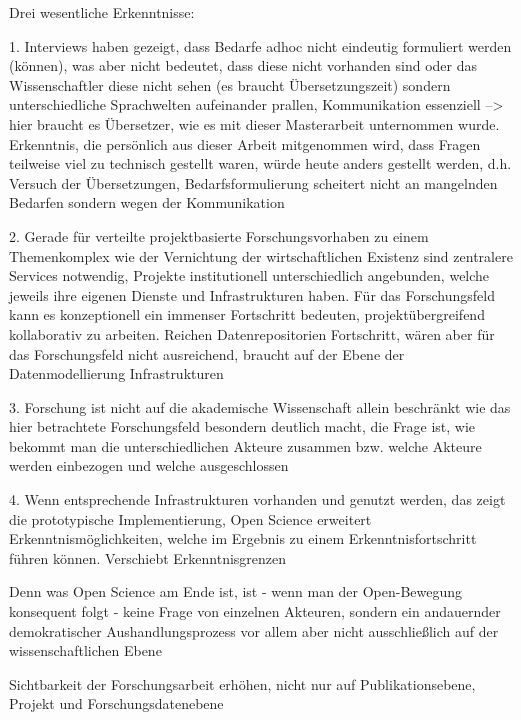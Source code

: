 \onehalfspacing



Drei wesentliche Erkenntnisse:

1. Interviews haben gezeigt, dass Bedarfe adhoc nicht eindeutig formuliert werden (können), was aber nicht bedeutet, dass diese nicht vorhanden sind oder das Wissenschaftler diese nicht sehen (es braucht Übersetzungszeit) sondern unterschiedliche Sprachwelten aufeinander prallen, Kommunikation essenziell --> hier braucht es Übersetzer, wie es mit dieser Masterarbeit unternommen wurde. Erkenntnis, die persönlich aus dieser Arbeit mitgenommen wird, dass Fragen teilweise viel zu technisch gestellt waren, würde heute anders gestellt werden, d.h. Versuch der Übersetzungen, Bedarfsformulierung scheitert nicht an mangelnden Bedarfen sondern wegen der Kommunikation

2. Gerade für verteilte projektbasierte Forschungsvorhaben zu einem Themenkomplex wie der Vernichtung der wirtschaftlichen Existenz sind zentralere Services notwendig, Projekte institutionell unterschiedlich angebunden, welche jeweils ihre eigenen Dienste und Infrastrukturen haben. Für das Forschungsfeld kann es konzeptionell ein immenser Fortschritt bedeuten, projektübergreifend kollaborativ zu arbeiten. Reichen Datenrepositorien Fortschritt, wären aber für das Forschungsfeld nicht ausreichend, braucht auf der Ebene der Datenmodellierung Infrastrukturen

3. Forschung ist nicht auf die akademische Wissenschaft allein beschränkt wie das hier betrachtete Forschungsfeld besondern deutlich macht, die Frage ist, wie bekommt man die unterschiedlichen Akteure zusammen bzw. welche Akteure werden einbezogen und welche ausgeschlossen

4. Wenn entsprechende Infrastrukturen vorhanden und genutzt werden, das zeigt die prototypische Implementierung, Open Science erweitert Erkenntnismöglichkeiten, welche im Ergebnis zu einem Erkenntnisfortschritt führen können. Verschiebt Erkenntnisgrenzen


Denn was Open Science am Ende ist, ist - wenn man der Open-Bewegung konsequent folgt - keine Frage von einzelnen Akteuren, sondern ein andauernder demokratischer Aushandlungsprozess vor allem aber nicht ausschließlich auf der wissenschaftlichen Ebene


Sichtbarkeit der Forschungsarbeit erhöhen, nicht nur auf Publikationsebene, Projekt und Forschungsdatenebene